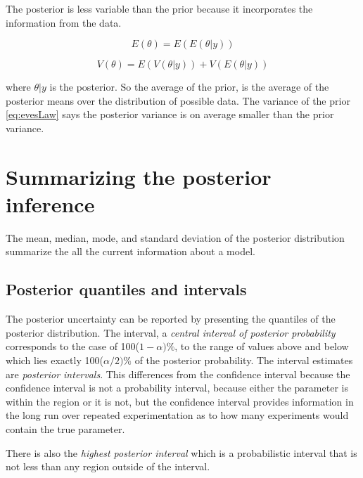\documentclass[
]{book}
\theoremstyle{definition}
\theoremstyle{definition}
\theoremstyle{definition}
\theoremstyle{definition}
\theoremstyle{remark}
\begin{document}
The posterior is less variable than the prior because it incorporates the information from the data.

\begin{equation}
E(\theta) = E(E(\theta | y))
\label{eq:adamsLaw}
\end{equation}

\begin{equation}
V(\theta) = E(V(\theta|y)) + V(E(\theta | y))
\label{eq:evesLaw}
\end{equation}

where \(\theta|y\) is the posterior. So the average of the prior, is the average of the posterior means over the distribution of possible data. The variance of the prior \eqref{eq:evesLaw} says the posterior variance is on average smaller than the prior variance.

\hypertarget{summarizing-the-posterior-inference}{%
\section{Summarizing the posterior inference}\label{summarizing-the-posterior-inference}}

The mean, median, mode, and standard deviation of the posterior distribution summarize the all the current information about a model.

\hypertarget{posterior-quantiles-and-intervals}{%
\subsection*{Posterior quantiles and intervals}\label{posterior-quantiles-and-intervals}}

The posterior uncertainty can be reported by presenting the quantiles of the posterior distribution. The interval, a \emph{central interval of posterior probability} corresponds to the case of 100(\(1-\alpha)\%\), to the range of values above and below which lies exactly 100(\(\alpha/2)\%\) of the posterior probability. The interval estimates are \emph{posterior intervals}. This differences from the confidence interval because the confidence interval is not a probability interval, because either the parameter is within the region or it is not, but the confidence interval provides information in the long run over repeated experimentation as to how many experiments would contain the true parameter.

There is also the \emph{highest posterior interval} which is a probabilistic interval that is not less than any region outside of the interval.
\end{document}
